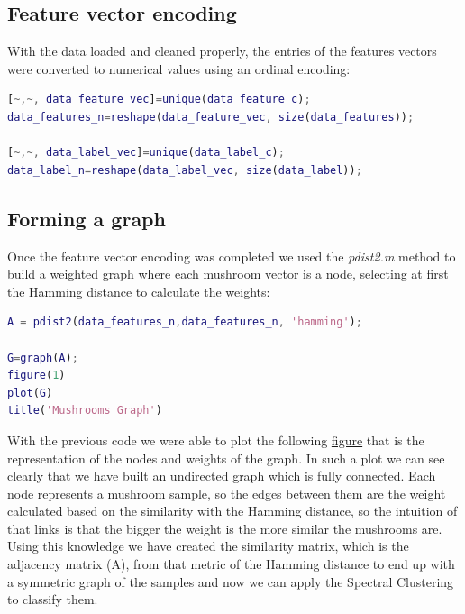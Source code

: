 \documentclass[12pt]{article}
\begin{document}
\subsection{Feature vector encoding}
\justifying
With the data loaded and cleaned properly, the entries of the features vectors were converted to numerical values using an ordinal encoding:
\smallskip
\begin{lstlisting}[language=matlab]
[~,~, data_feature_vec]=unique(data_feature_c);
data_features_n=reshape(data_feature_vec, size(data_features));

[~,~, data_label_vec]=unique(data_label_c);
data_label_n=reshape(data_label_vec, size(data_label));
\end{lstlisting}

\subsection{Forming a graph}
\justifying
Once the feature vector encoding was completed we used the \emph{pdist2.m} method to build a weighted graph where each mushroom vector is a node, selecting at first the Hamming distance to calculate the weights:
\smallskip
\begin{lstlisting}[language=matlab]
A = pdist2(data_features_n,data_features_n, 'hamming');

G=graph(A); 
figure(1)
plot(G)
title('Mushrooms Graph')
\end{lstlisting}
\justifying
With the previous code we were able to plot the following  \href{fig:graphRepresentation}{figure} that is the representation of the nodes and weights of the graph. In such a plot we can see clearly that we have built an undirected graph which is fully connected. Each node represents a mushroom sample, so the edges between them are the weight calculated based on the similarity with the Hamming distance, so the intuition of that links is that the bigger the weight is the more similar the mushrooms are. Using this knowledge we have created the similarity matrix, which is the adjacency matrix (A), from that metric of the Hamming distance to end up with a symmetric graph of the samples and now we can apply the Spectral Clustering to classify them.
\end{document}
